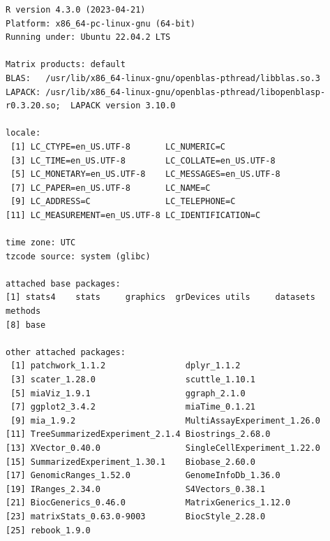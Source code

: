 \documentclass[
]{book}
\begin{document}
\begin{verbatim}
R version 4.3.0 (2023-04-21)
Platform: x86_64-pc-linux-gnu (64-bit)
Running under: Ubuntu 22.04.2 LTS

Matrix products: default
BLAS:   /usr/lib/x86_64-linux-gnu/openblas-pthread/libblas.so.3 
LAPACK: /usr/lib/x86_64-linux-gnu/openblas-pthread/libopenblasp-r0.3.20.so;  LAPACK version 3.10.0

locale:
 [1] LC_CTYPE=en_US.UTF-8       LC_NUMERIC=C              
 [3] LC_TIME=en_US.UTF-8        LC_COLLATE=en_US.UTF-8    
 [5] LC_MONETARY=en_US.UTF-8    LC_MESSAGES=en_US.UTF-8   
 [7] LC_PAPER=en_US.UTF-8       LC_NAME=C                 
 [9] LC_ADDRESS=C               LC_TELEPHONE=C            
[11] LC_MEASUREMENT=en_US.UTF-8 LC_IDENTIFICATION=C       

time zone: UTC
tzcode source: system (glibc)

attached base packages:
[1] stats4    stats     graphics  grDevices utils     datasets  methods  
[8] base     

other attached packages:
 [1] patchwork_1.1.2                dplyr_1.1.2                   
 [3] scater_1.28.0                  scuttle_1.10.1                
 [5] miaViz_1.9.1                   ggraph_2.1.0                  
 [7] ggplot2_3.4.2                  miaTime_0.1.21                
 [9] mia_1.9.2                      MultiAssayExperiment_1.26.0   
[11] TreeSummarizedExperiment_2.1.4 Biostrings_2.68.0             
[13] XVector_0.40.0                 SingleCellExperiment_1.22.0   
[15] SummarizedExperiment_1.30.1    Biobase_2.60.0                
[17] GenomicRanges_1.52.0           GenomeInfoDb_1.36.0           
[19] IRanges_2.34.0                 S4Vectors_0.38.1              
[21] BiocGenerics_0.46.0            MatrixGenerics_1.12.0         
[23] matrixStats_0.63.0-9003        BiocStyle_2.28.0              
[25] rebook_1.9.0                  


\end{verbatim}
\end{document}
